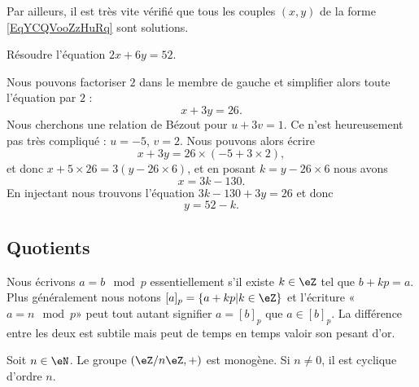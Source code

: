 Par ailleurs, il est très vite vérifié que tous les couples \( (x,y)\) de la forme \eqref{EqYCQVooZzHuRq} sont solutions.

\begin{example}
    Résoudre l'équation \( 2x+6y=52\).

    Nous pouvons factoriser \( 2\) dans le membre de gauche et simplifier alors toute l'équation par \( 2\) :
    \begin{equation}
        x+3y=26.
    \end{equation}
    Nous cherchons une relation de Bézout pour \( u+3v=1\). Ce n'est heureusement pas très compliqué : \( u=-5\), \( v=2\). Nous pouvons alors écrire
    \begin{equation}
        x+3y=26\times (-5+3\times 2),
    \end{equation}
    et donc \( x+5\times 26=3(y-26\times 6)\), et en posant \( k=y-26\times 6\) nous avons
    \begin{equation}
        x=3k-130.
    \end{equation}
    En injectant nous trouvons l'équation \( 3k-130+3y=26\) et donc
    \begin{equation}
        y=52-k.
    \end{equation}
\end{example}

\subsection{Quotients}

Nous écrivons \( a=b\mod p\) essentiellement s'il existe \( k\in \eZ\) tel que \( b+kp=a\). Plus généralement nous notons \( [a]_p=\{ a+kp|k\in \eZ \}\) et l'écriture «\( a=n\mod p\)» peut tout autant signifier \( a=[b]_p\) que \( a\in [b]_p\). La différence entre les deux est subtile mais peut de temps en temps valoir son pesant d'or.

\begin{proposition}
    Soit \( n\in\eN\). Le groupe \( (\eZ/n\eZ, +)\) est monogène. Si \( n\neq 0\), il est cyclique d'ordre \( n\).
\end{proposition}

